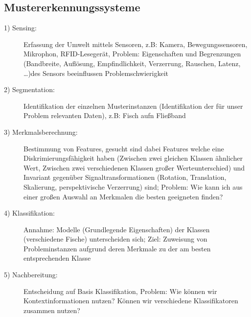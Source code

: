 \documentclass{article} %
\theoremstyle{definition}
\begin{document}
	\subsection{Mustererkennungssysteme}
		\begin{description}
			\item[1) Sensing:] Erfassung der Umwelt mittels Sensoren, z.B: Kamera, Bewegungssensoren, Mikrophon, RFID-Lesegerät, Problem: Eigenschaften und Begrenzungen (Bandbreite, Auflösung, Empfindlichkeit, Verzerrung, Rauschen, Latenz, \dots)des Sensors beeinflussen Problemschwierigkeit 			
			\item[2) Segmentation:] Identifikation der einzelnen Musterinstanzen (Identifikation der für unser Problem relevanten Daten), z.B: Fisch aufn Fließband
			\item[3) Merkmalsberechnung:] Bestimmung von Features, gesucht sind dabei Features welche eine Diskrimierungsfähigkeit haben (Zwischen zwei gleichen Klassen ähnlicher Wert, Zwischen zwei verschiedenen Klassen großer Werteunterschied) und Invariant gegenüber Signaltransformationen (Rotation, Translation, Skalierung, perspektivische Verzerrung) sind; Problem: Wie kann ich aus einer großen Auswahl an Merkmalen die besten geeigneten finden?
			\item[4) Klassifikation:] Annahme: Modelle (Grundlegende Eigenschaften) der Klassen (verschiedene Fische) unterscheiden sich; Ziel: Zuweisung von Probleminstanzen aufgrund deren Merkmale zu der am besten entsprechenden Klasse			
			\item[5) Nachbereitung:] Entscheidung auf Basis Klassifikation, Problem: Wie können wir Kontextinformationen nutzen? Können wir verschiedene Klassifikatoren zusammen nutzen? 
		\end{description}
\end{document}
